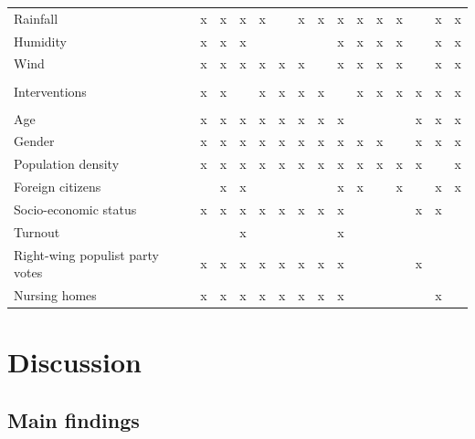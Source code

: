 \documentclass[]{elsarticle} %
\begin{document}
\begin{table}
\begin{tabular}[t]{lllllllllllllll}
\hspace{1em}Rainfall & x & x & x & x &  & x & x & x & x & x & x &  & x & x\\
\hspace{1em}Humidity & x & x & x &  &  &  &  & x & x & x & x &  & x & x\\
\hspace{1em}Wind & x & x & x & x & x & x &  & x & x & x & x &  & x & x\\
\addlinespace[0.3em]
\multicolumn{15}{l}{\textbf{Interventions}}\\
\hspace{1em}Interventions & x & x &  & x & x & x & x &  & x & x & x & x & x & x\\
\addlinespace[0.3em]
\multicolumn{15}{l}{\textbf{Socio-demographic}}\\
\hspace{1em}Age & x & x & x & x & x & x & x & x &  &  &  & x & x & x\\
\hspace{1em}Gender & x & x & x & x & x & x & x & x & x & x &  & x & x & x\\
\hspace{1em}Population density & x & x & x & x & x & x & x & x & x & x & x & x &  & x\\
\hspace{1em}Foreign citizens &  & x & x &  &  &  &  & x & x &  & x &  & x & x\\
\hspace{1em}Socio-economic status & x & x & x & x & x & x & x & x &  &  &  & x & x & \\
\hspace{1em}Turnout &  &  & x &  &  &  &  & x &  &  &  &  &  & \\
\hspace{1em}Right-wing populist party votes & x & x & x & x & x & x & x & x &  &  &  & x &  & \\
\hspace{1em}Nursing homes & x & x & x & x & x & x & x & x &  &  &  &  & x & \\
\bottomrule
\end{tabular}
\end{table}

\hypertarget{discussion}{%
\section{Discussion}\label{discussion}}

\hypertarget{main-findings}{%
\subsection{Main findings}\label{main-findings}}
\end{document}
